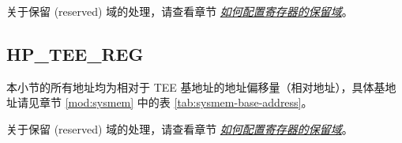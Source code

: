 \documentclass[main\_\_CN.tex]{subfiles}
\begin{document}
关于保留 (reserved) 域的处理，请查看章节 \hyperref[programming-reserved-field]{\textit{如何配置寄存器的保留域}}。



\subsection{HP\_TEE\_REG}

本小节的所有地址均为相对于 TEE 基地址的地址偏移量（相对地址），具体基地址请见章节 \ref{mod:sysmem} \textit{} 中的表 \ref{tab:sysmem-base-address}。

关于保留 (reserved) 域的处理，请查看章节 \hyperref[programming-reserved-field]{\textit{如何配置寄存器的保留域}}。


\end{document}
